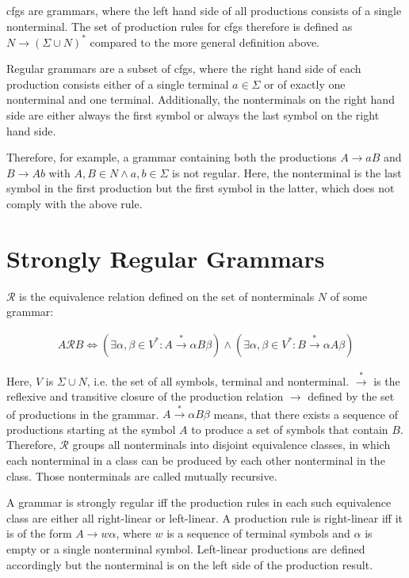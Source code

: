 \Acfp{cfg} are grammars, where the left hand side of all productions consists of a single nonterminal. The set of production rules for \acp{cfg} therefore is defined as $N \rightarrow (\Sigma \cup N)^*$ compared to the more general definition above.

Regular grammars are a subset of \acp{cfg}, where the right hand side of each production consists either of a single terminal $a \in \Sigma$ or of exactly one nonterminal and one terminal. Additionally, the nonterminals on the right hand side are either always the first symbol or always the last symbol on the right hand side. 

Therefore, for example, a grammar containing both the productions $A \rightarrow aB$ and $B \rightarrow Ab$ with $A, B \in N \land a, b \in \Sigma$ is not regular. Here, the nonterminal is the last symbol in the first production but the first symbol in the latter, which does not comply with the above rule.

\section{Strongly Regular Grammars}\label{sec:background:srg}

$\mathcal{R}$ is the equivalence relation defined on the set of nonterminals $N$ of some grammar:

\begin{align}
	A \mathcal{R} B \Leftrightarrow (\exists \alpha, \beta \in V^* : A \xrightarrow{*} \alpha B \beta) \land (\exists \alpha, \beta \in V^* : B \xrightarrow{*} \alpha A \beta) 
\end{align}

Here, $V$ is $\Sigma \cup N$, i.e. the set of all symbols, terminal and nonterminal. $\xrightarrow{*}$ is the reflexive and transitive closure of the production relation $\rightarrow$ defined by the set of productions in the grammar. $A \xrightarrow{*} \alpha B \beta$ means, that there exists a sequence of productions starting at the symbol $A$ to produce a set of symbols that contain $B$. Therefore, $\mathcal{R}$ groups all nonterminals into disjoint equivalence classes, in which each nonterminal in a class can be produced by each other nonterminal in the class. Those nonterminals are called mutually recursive.

A grammar is strongly regular iff the production rules in each such equivalence class are either all right-linear or left-linear.
A production rule is right-linear iff it is of the form $A \rightarrow w \alpha$, where $w$ is a sequence of terminal symbols and $\alpha$ is empty or a single nonterminal symbol. Left-linear productions are defined accordingly but the nonterminal is on the left side of the production result.

